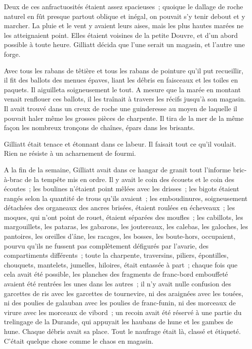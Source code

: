 \documentclass[french,twoside]{book} %
\begin{document}
Deux de ces anfractuosités étaient assez spacieuses ; quoique le dallage de roche naturel en fût presque partout oblique et inégal, on pouvait s’y tenir debout et y marcher. La pluie et le vent y avaient leurs aises, mais les plus hautes marées ne les atteignaient point. Elles étaient voisines de la petite Douvre, et  d’un abord possible à toute heure. Gilliatt décida que l’une serait un magasin, et l’autre une forge.\par
Avec tous les rabans de têtière et tous les rabans de pointure qu’il put recueillir, il fit des ballots des menues épaves, liant les débris en faisceaux et les toiles en paquets. Il aiguilleta soigneusement le tout. A mesure que la marée en montant venait renflouer ces ballots, il les traînait à travers les récifs jusqu’à son magasin. Il avait trouvé dans un creux de roche une guinderesse au moyen de laquelle il pouvait haler même les grosses pièces de charpente. Il tira de la mer de la même façon les nombreux tronçons de chaînes, épars dans les brisants.\par
Gilliatt était tenace et étonnant dans ce labeur. Il faisait tout ce qu’il voulait. Rien ne résiste à un acharnement de fourmi.\par
A la fin de la semaine, Gilliatt avait dans ce hangar de granit tout l’informe bric-à-brac de la tempête mis en ordre. Il y avait le coin des écouets et le coin des écoutes ; les boulines n’étaient point mêlées avec les drisses ; les bigots étaient rangés selon la quantité de trous qu’ils avaient ; les emboudinures, soigneusement détachées des organeaux des ancres brisées, étaient roulées en écheveaux ; les moques, qui n’ont point de rouet, étaient séparées des moufles ; les cabillots, les margouillets, les pataras, les gabarons, les joutereaux, les calebas, les galoches, les pantoires, les oreilles d’âne, les racages, les bosses, les boute-hors, occupaient, pourvu qu’ils ne fussent pas complètement défigurés par l’avarie, des compartiments différents ;  toute la charpente, traversins, piliers, épontilles, chouquets, mantelets, jumelles, hiloires, était entassée à part ; chaque fois que cela avait été possible, les planches des fragments de franc-bord embouffeté avaient été rentrées les unes dans les autres ; il n’y avait nulle confusion des garcettes de ris avec les garcettes de tournevire, ni des araignées avec les touées, ni des poulies de galauban avec les poulies de franc-funin, ni des morceaux de virure avec les morceaux de vibord ; un recoin avait été réservé à une partie du trelingage de la Durande, qui appuyait les haubans de hune et les gambes de hune. Chaque débris avait sa place. Tout le naufrage était là, classé et étiqueté. C’était quelque chose comme le chaos en magasin.\par
\end{document}
